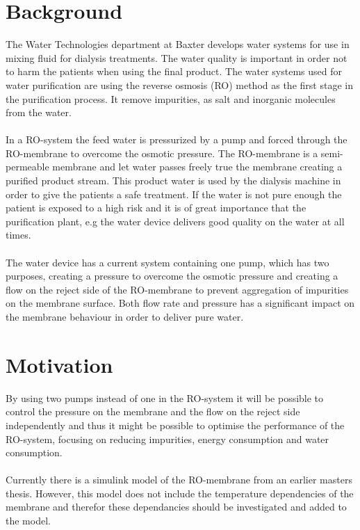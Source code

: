 
\section{Background}

The Water Technologies department at Baxter develops water systems for use in mixing fluid for dialysis treatments. The water quality is important in order not to harm the patients when using the final product. The water systems used for water purification are using the reverse osmosis (RO) method as the first stage in the purification process. It remove impurities, as salt and inorganic molecules from the water\cite{Dow}.\\
\\
In a RO-system the feed water is pressurized by a pump and forced through the RO-membrane to overcome the osmotic pressure. The RO-membrane is a semi-permeable membrane and let water passes freely true the membrane creating a purified product stream. This product water is used by the dialysis machine in order to give the patients a safe treatment. If the water is not pure enough the patient is exposed to a high risk and it is of great importance that the purification plant, e.g the water device delivers good quality on the water at all times.\\
\\
The water device has a current system containing one pump, which has two purposes, creating a pressure to overcome the osmotic pressure and creating a flow on the reject side of the RO-membrane to prevent aggregation of impurities on the membrane surface. Both flow rate and pressure has a significant impact on the membrane behaviour in order to deliver pure water.\\


\section{Motivation}
By using two pumps instead of one in the RO-system it will be possible to control the pressure on the membrane and the flow on the reject side independently and thus it might be possible to optimise the performance of the RO-system, focusing on reducing impurities, energy consumption and water consumption. \\
\\
Currently there is a simulink model of the RO-membrane from an earlier masters thesis. However, this model does not include the temperature dependencies of the membrane and therefor these dependancies should be investigated and added to the model. 
